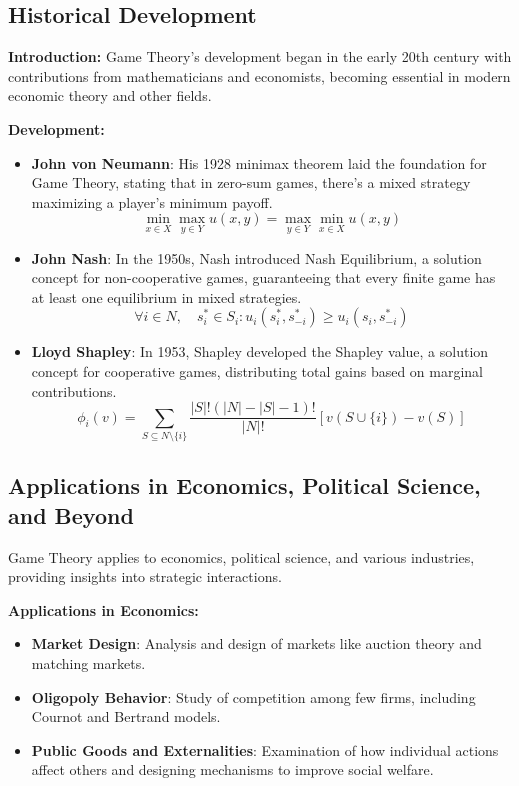 \documentclass[12pt]{book} %
\begin{document}
\subsection{Historical Development}

\textbf{Introduction:} Game Theory's development began in the early 20th century with contributions from mathematicians and economists, becoming essential in modern economic theory and other fields.

\textbf{Development:}

\begin{itemize}
    \item \textbf{John von Neumann}: His 1928 minimax theorem laid the foundation for Game Theory, stating that in zero-sum games, there's a mixed strategy maximizing a player's minimum payoff.
    \[
    \min_{x \in X} \max_{y \in Y} u(x, y) = \max_{y \in Y} \min_{x \in X} u(x, y)
    \]

    \item \textbf{John Nash}: In the 1950s, Nash introduced Nash Equilibrium, a solution concept for non-cooperative games, guaranteeing that every finite game has at least one equilibrium in mixed strategies.
    \[
    \forall i \in N, \quad s_i^* \in S_i : u_i(s_i^*, s_{-i}^*) \geq u_i(s_i, s_{-i}^*)
    \]

    \item \textbf{Lloyd Shapley}: In 1953, Shapley developed the Shapley value, a solution concept for cooperative games, distributing total gains based on marginal contributions.
    \[
    \phi_i(v) = \sum_{S \subseteq N \setminus \{i\}} \frac{|S|!(|N|-|S|-1)!}{|N|!} [v(S \cup \{i\}) - v(S)]
    \]
\end{itemize}

\subsection{Applications in Economics, Political Science, and Beyond}

Game Theory applies to economics, political science, and various industries, providing insights into strategic interactions.

\textbf{Applications in Economics:}

\begin{itemize}
    \item \textbf{Market Design}: Analysis and design of markets like auction theory and matching markets.
    \item \textbf{Oligopoly Behavior}: Study of competition among few firms, including Cournot and Bertrand models.
    \item \textbf{Public Goods and Externalities}: Examination of how individual actions affect others and designing mechanisms to improve social welfare.
\end{itemize}
\end{document}
